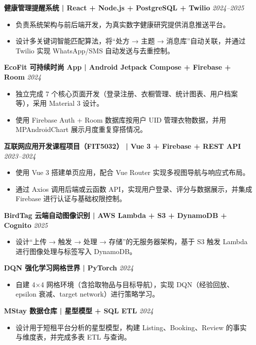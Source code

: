 \documentclass[a4paper,10pt]{article}
\begin{document}
\textbf{健康管理提醒系统 | React + Node.js + PostgreSQL + Twilio} \hfill \textit{2024–2025}
\begin{itemize}
    \item 负责系统架构与前后端开发，为真实数字健康研究提供消息推送平台。
    \item 设计多关键词智能匹配算法，将“处方 → 主题 → 消息库”自动关联，并通过 Twilio 实现 WhatsApp/SMS 自动发送与去重控制。
\end{itemize}

\textbf{EcoFit 可持续时尚 App | Android Jetpack Compose + Firebase + Room} \hfill \textit{2024}
\begin{itemize}
    \item 独立完成 7 个核心页面开发（登录注册、衣橱管理、统计图表、用户档案等），采用 Material 3 设计。
    \item 使用 Firebase Auth + Room 数据库按用户 UID 管理衣物数据，并用 MPAndroidChart 展示月度重复穿搭情况。
\end{itemize}

\textbf{互联网应用开发课程项目（FIT5032） | Vue 3 + Firebase + REST API} \hfill \textit{2023–2024}
\begin{itemize}
    \item 使用 Vue 3 搭建单页应用，配合 Vue Router 实现多视图导航与响应式布局。
    \item 通过 Axios 调用后端或云函数 API，实现用户登录、评分与数据展示，并集成 Firebase 进行认证与基础权限控制。
\end{itemize}

\textbf{BirdTag 云端自动图像识别 | AWS Lambda + S3 + DynamoDB + Cognito} \hfill \textit{2025}
\begin{itemize}
    \item 设计“上传 → 触发 → 处理 → 存储”的无服务器架构，基于 S3 触发 Lambda 进行图像处理与标签写入 DynamoDB。
\end{itemize}

\textbf{DQN 强化学习网格世界 | PyTorch} \hfill \textit{2024}
\begin{itemize}
    \item 自建 4×4 网格环境（含拾取物品与目标导航），实现 DQN（经验回放、epsilon 衰减、target network）进行策略学习。
\end{itemize}

\textbf{MStay 数据仓库 | 星型模型 + SQL ETL} \hfill \textit{2024}
\begin{itemize}
    \item 设计用于短租平台分析的星型模型，构建 Listing、Booking、Review 的事实与维度表，并完成多表 ETL 与查询。
\end{itemize}
\end{document}
